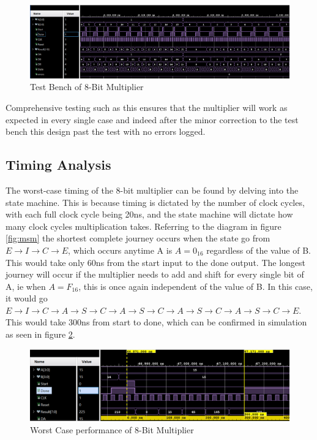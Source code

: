 \documentclass[11pt]{article}
\begin{document}
\begin{figure}[H]        
    \centering
    \includegraphics[width=\textwidth]{8bit_test.png}
    \caption{Test Bench of 8-Bit Multiplier}
    \label{fig:4bit_testbench}
\end{figure} 

Comprehensive testing such as this ensures that the multiplier will work as expected in every single case
and indeed after the minor correction to the test bench this design past the test with no errors logged.

\subsection{Timing Analysis}

The worst-case timing of the 8-bit multiplier can be found by delving into the state machine. 
This is because timing is dictated by the number of clock cycles, with each full clock cycle being 20ns, and the state machine will dictate how many clock cycles multiplication takes.
Referring to the diagram in figure \ref{fig:msm} the shortest complete journey occurs when the state go from $E \rightarrow I \rightarrow C \rightarrow E$, which occurs anytime A is $A = 0_{16}$ regardless of the value of B.
This would take only 60ns from the start input to the done output.
The longest journey will occur if the multiplier needs to add and shift for every single bit of A, ie when $A = F_{16}$, this is once again independent of the value of B.
In this case, it would go $E \rightarrow I \rightarrow C \rightarrow A \rightarrow S \rightarrow C \rightarrow A \rightarrow S \rightarrow C \rightarrow A \rightarrow S \rightarrow C \rightarrow A \rightarrow S \rightarrow C \rightarrow E$.
This would take 300ns from start to done, which can be confirmed in simulation as seen in figure \ref{fig:4bit_worstcase}.

\begin{figure}[H]        
    \centering
    \includegraphics[width=\textwidth]{8bit_worst.png}
    \caption{Worst Case performance of 8-Bit Multiplier}
    \label{fig:4bit_worstcase}
\end{figure} 
\end{document}
